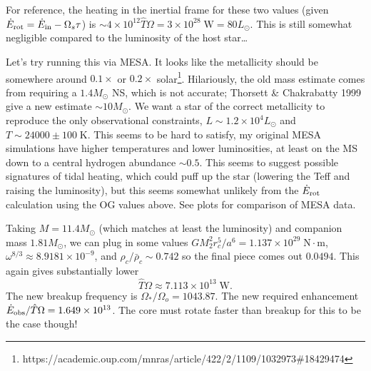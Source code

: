 \documentclass[11pt,
        usenames, %
        dvipsnames %
    ]{article}
\newcommand*{\scinot}[2]{#1\times10^{#2}}
\begin{document}
For reference, the heating in the inertial frame for these two values (given
$\dot{E}_{\rm rot} = \dot{E}_{\rm in} - \Omega_s \tau$) is $\sim \scinot{4}{12}
\hat{T}\Omega = \scinot{3}{28}\;\mathrm{W} = 80L_{\odot}$. This is still
somewhat negligible compared to the luminosity of the host star\dots

Let's try running this via MESA\@. It looks like the metallicity should be
somewhere around $0.1\times$ or $0.2\times$
solar\footnote{https://academic.oup.com/mnras/article/422/2/1109/1032973\#18429474}.
Hilariously, the old mass estimate comes from requiring a $1.4M_{\odot}$ NS,
which is not accurate; Thorsett \& Chakrabatty 1999 give a new estimate $\sim 10
M_{\odot}$. We want a star of the correct metallicity to reproduce the only
observational constraints, $L \sim \scinot{1.2}{4}L_{\odot}$ and $T \sim 24000
\pm 100\;\mathrm{K}$. This seems to be hard to satisfy, my original MESA
simulations have higher temperatures and lower luminosities, at least on the MS
down to a central hydrogen abundance $\sim 0.5$. This seems to suggest possible
signatures of tidal heating, which could puff up the star (lowering the Teff and
raising the luminosity), but this seems somewhat unlikely from the $\dot{E}_{\rm
rot}$ calculation using the OG values above. See plots for comparison of MESA
data. %

Taking $M = 11.4M_{\odot}$ (which matches at least the luminosity) and companion
mass $1.81 M_{\odot}$, we can plug in some values
$GM_2^2 r_c^5 / a^6 = \scinot{1.137}{29}\;\mathrm{N \cdot m}$,
$\omega^{8/3} \approx \scinot{8.9181}{-9}$, and
$\rho_c / \bar{\rho}_c \sim 0.742$ so the final piece comes out $0.0494$. This
again gives substantially lower
\begin{equation}
    \hat{T}\Omega \approx \scinot{7.113}{13}\;\mathrm{W}.
\end{equation}
The new breakup frequency is $\Omega_* / \Omega_o = 1043.87$. The new required
enhancement $\dot{E}_{\rm obs} / \hat{T}\Omega = \scinot{1.649}{13}$. The core
must rotate faster than breakup for this to be the case though!
\end{document}

